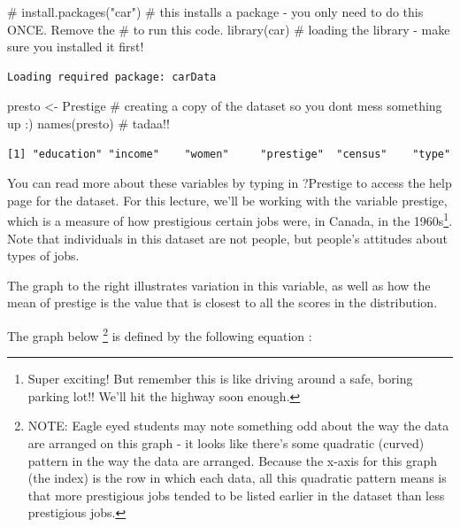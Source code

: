 \documentclass[
  letterpaper,
  DIV=11,
  numbers=noendperiod,
  oneside]{scrreprt}
\newenvironment{Shaded}{\begin{snugshade}}{\end{snugshade}}
\newcommand{\CommentTok}[1]{\textcolor[rgb]{0.37,0.37,0.37}{#1}}
\newcommand{\FunctionTok}[1]{\textcolor[rgb]{0.28,0.35,0.67}{#1}}
\newcommand{\NormalTok}[1]{\textcolor[rgb]{0.00,0.23,0.31}{#1}}
\newcommand{\OtherTok}[1]{\textcolor[rgb]{0.00,0.23,0.31}{#1}}
\begin{document}
\begin{Shaded}
\begin{Highlighting}[]
\CommentTok{\# install.packages("car") \# this installs a package {-} you only need to do this ONCE. Remove the \# to run this code.}
\FunctionTok{library}\NormalTok{(car) }\CommentTok{\# loading the library {-} make sure you installed it first!}
\end{Highlighting}
\end{Shaded}

\begin{verbatim}
Loading required package: carData
\end{verbatim}

\begin{Shaded}
\begin{Highlighting}[]
\NormalTok{presto }\OtherTok{\textless{}{-}}\NormalTok{ Prestige }\CommentTok{\# creating a copy of the dataset so you don\textquotesingle{}t mess something up :)}
\FunctionTok{names}\NormalTok{(presto) }\CommentTok{\# tadaa!!}
\end{Highlighting}
\end{Shaded}

\begin{verbatim}
[1] "education" "income"    "women"     "prestige"  "census"    "type"     
\end{verbatim}

You can read more about these variables by typing in ?Prestige to access
the help page for the dataset. For this lecture, we'll be working with
the variable prestige, which is a measure of how prestigious certain
jobs were, in Canada, in the 1960s\footnote{Super exciting! But remember
  this is like driving around a safe, boring parking lot!! We'll hit the
  highway soon enough.}. Note that individuals in this dataset are not
people, but people's attitudes about types of jobs.

The graph to the right illustrates variation in this variable, as well
as how the mean of prestige is the value that is closest to all the
scores in the distribution.

The graph below \footnote{NOTE: Eagle eyed students may note something
  odd about the way the data are arranged on this graph - it looks like
  there's some quadratic (curved) pattern in the way the data are
  arranged. Because the x-axis for this graph (the index) is the row in
  which each data, all this quadratic pattern means is that more
  prestigious jobs tended to be listed earlier in the dataset than less
  prestigious jobs.} is defined by the following equation :
\end{document}
